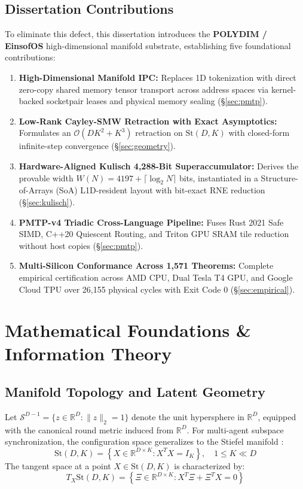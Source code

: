 \documentclass[journal,10pt,compsoc]{IEEEtran}
\theoremstyle{plain}
\theoremstyle{definition}
\begin{document}
\subsection{Dissertation Contributions}
To eliminate this defect, this dissertation introduces the \textbf{POLYDIM / EinsofOS} high-dimensional manifold substrate, establishing five foundational contributions:
\begin{enumerate}
    \item \textbf{High-Dimensional Manifold IPC:} Replaces 1D tokenization with direct zero-copy shared memory tensor transport across address spaces via kernel-backed socketpair leases and physical memory sealing (\S\ref{sec:pmtp}).
    \item \textbf{Low-Rank Cayley-SMW Retraction with Exact Asymptotics:} Formulates an $\mathcal{O}(D K^2 + K^3)$ retraction on $\mathrm{St}(D, K)$ with closed-form infinite-step convergence (\S\ref{sec:geometry}).
    \item \textbf{Hardware-Aligned Kulisch 4,288-Bit Superaccumulator:} Derives the provable width $W(N) = 4197 + \lceil \log_2 N \rceil$ bits, instantiated in a Structure-of-Arrays (SoA) L1D-resident layout with bit-exact RNE reduction (\S\ref{sec:kulisch}).
    \item \textbf{PMTP-v4 Triadic Cross-Language Pipeline:} Fuses Rust 2021 Safe SIMD, C++20 Quiescent Routing, and Triton GPU SRAM tile reduction without host copies (\S\ref{sec:pmtp}).
    \item \textbf{Multi-Silicon Conformance Across 1,571 Theorems:} Complete empirical certification across AMD CPU, Dual Tesla T4 GPU, and Google Cloud TPU over 26,155 physical cycles with Exit Code 0 (\S\ref{sec:empirical}).
\end{enumerate}

\section{Mathematical Foundations \& Information Theory}
\label{sec:foundations}

\subsection{Manifold Topology and Latent Geometry}
Let $\mathcal{S}^{D-1} = \{z \in \mathbb{R}^D : \|z\|_2 = 1\}$ denote the unit hypersphere in $\mathbb{R}^D$, equipped with the canonical round metric induced from $\mathbb{R}^D$. For multi-agent subspace synchronization, the configuration space generalizes to the Stiefel manifold \cite{stiefel1935richtungsfelder}:
\begin{equation}
\label{eq:stiefel_def}
\mathrm{St}(D, K) = \left\{ X \in \mathbb{R}^{D \times K} : X^T X = I_K \right\}, \quad 1 \le K \ll D
\end{equation}
The tangent space at a point $X \in \mathrm{St}(D, K)$ is characterized by:
\begin{equation}
\label{eq:tangent_space}
T_X \mathrm{St}(D, K) = \left\{ \Xi \in \mathbb{R}^{D \times K} : X^T \Xi + \Xi^T X = 0 \right\}
\end{equation}
\end{document}
